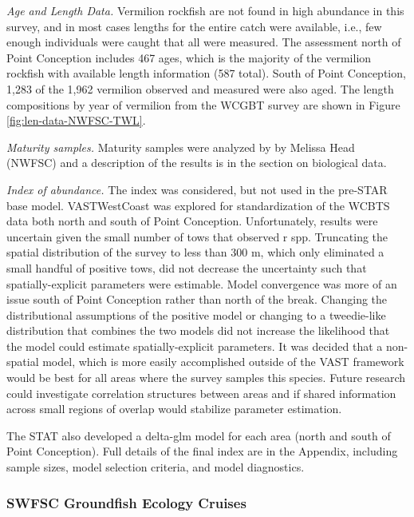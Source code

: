 \documentclass[
  english,
  a4paper,
]{article}
\begin{document}
\emph{Age and Length Data.} Vermilion rockfish are not found in high abundance in this survey, and in most
cases lengths for the entire catch were available, i.e., few enough individuals were caught that
all were measured. The assessment north of Point Conception includes 467 ages, which
is the majority of the vermilion rockfish with available length information (587 total).
South of Point Conception, 1,283 of the 1,962 vermilion observed and measured were also aged.
The length compositions by year of vermilion from the WCGBT survey are shown in Figure \ref{fig:len-data-NWFSC-TWL}.

\emph{Maturity samples.} Maturity samples were analyzed by by Melissa Head (NWFSC) and a
description of the results is in the section on biological data.

\emph{Index of abundance.} The index was considered, but not used in the pre-STAR base model.
VASTWestCoast was explored for standardization of the WCBTS data both north and south of Point Conception. Unfortunately, results were uncertain given the small number of tows that observed r spp. Truncating the spatial distribution of the survey to less than 300 m, which only eliminated a small handful of positive tows, did not decrease the uncertainty such that spatially-explicit parameters were estimable. Model convergence was more of an issue south of Point Conception rather than north of the break. Changing the distributional assumptions of the positive model or changing to a tweedie-like distribution that combines the two models did not increase the likelihood that the model could estimate spatially-explicit parameters. It was decided that a non-spatial model, which is more easily accomplished outside of the VAST framework would be best for all areas where the survey samples this species. Future research could investigate correlation structures between areas and if shared information across small regions of overlap would stabilize parameter estimation.

The STAT also developed
a delta-glm model for each area (north and south of Point Conception). Full details
of the final index are in the Appendix, including
sample sizes, model selection criteria, and model diagnostics.

\hypertarget{swfsc-groundfish-ecology-cruises}{%
\subsubsection{SWFSC Groundfish Ecology Cruises}\label{swfsc-groundfish-ecology-cruises}}
\end{document}
